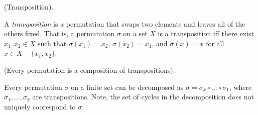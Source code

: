 \begin{defn}
    (Transposition).

    A \textit{transposition} is a permutation that swaps two elements and leaves all of the others fixed. That is, a permutation $\sigma$ on a set $X$ is a transposition iff there exist $x_1, x_2 \in X$ such that $\sigma(x_1) = x_2$, $\sigma(x_2) = x_1$, and $\sigma(x) = x$ for all $x \in X - \{x_1, x_2\}$.
\end{defn}

\begin{theorem}
    (Every permutation is a composition of transpositions).

    Every permutation $\sigma$ on a finite set can be decomposed as $\sigma = \sigma_k \circ ... \circ \sigma_1$, where $\sigma_1, ..., \sigma_k$ are transpositions. Note, the set of cycles in the decomposition does not uniquely coorespond to $\sigma$.
\end{theorem}

